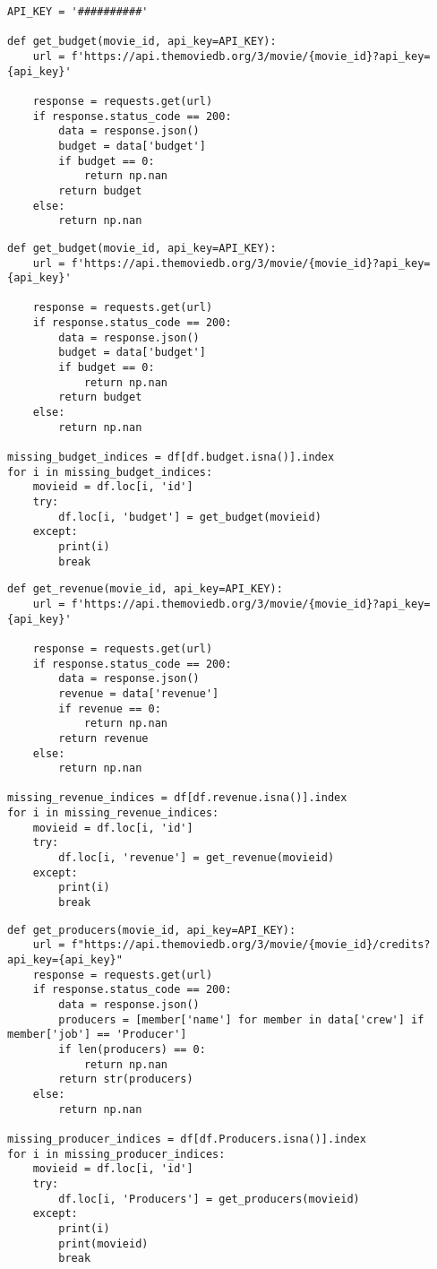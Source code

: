 \begin{lstlisting}
API_KEY = '##########'

def get_budget(movie_id, api_key=API_KEY):
    url = f'https://api.themoviedb.org/3/movie/{movie_id}?api_key={api_key}'

    response = requests.get(url)
    if response.status_code == 200:
        data = response.json()
        budget = data['budget']
        if budget == 0:
            return np.nan
        return budget
    else:
        return np.nan
\end{lstlisting}

\begin{lstlisting}
def get_budget(movie_id, api_key=API_KEY):
    url = f'https://api.themoviedb.org/3/movie/{movie_id}?api_key={api_key}'

    response = requests.get(url)
    if response.status_code == 200:
        data = response.json()
        budget = data['budget']
        if budget == 0:
            return np.nan
        return budget
    else:
        return np.nan

missing_budget_indices = df[df.budget.isna()].index
for i in missing_budget_indices:
    movieid = df.loc[i, 'id']
    try:
        df.loc[i, 'budget'] = get_budget(movieid)
    except:
        print(i)
        break
\end{lstlisting}

\begin{lstlisting}
def get_revenue(movie_id, api_key=API_KEY):
    url = f'https://api.themoviedb.org/3/movie/{movie_id}?api_key={api_key}'

    response = requests.get(url)
    if response.status_code == 200:
        data = response.json()
        revenue = data['revenue']
        if revenue == 0:
            return np.nan
        return revenue
    else:
        return np.nan

missing_revenue_indices = df[df.revenue.isna()].index
for i in missing_revenue_indices:
    movieid = df.loc[i, 'id']
    try:
        df.loc[i, 'revenue'] = get_revenue(movieid)
    except:
        print(i)
        break
\end{lstlisting}

\begin{lstlisting}
def get_producers(movie_id, api_key=API_KEY):
    url = f"https://api.themoviedb.org/3/movie/{movie_id}/credits?api_key={api_key}"
    response = requests.get(url)
    if response.status_code == 200:
        data = response.json()
        producers = [member['name'] for member in data['crew'] if member['job'] == 'Producer']
        if len(producers) == 0:
            return np.nan
        return str(producers)
    else:
        return np.nan

missing_producer_indices = df[df.Producers.isna()].index
for i in missing_producer_indices:
    movieid = df.loc[i, 'id']
    try:
        df.loc[i, 'Producers'] = get_producers(movieid)
    except:
        print(i)
        print(movieid)
        break
\end{lstlisting}

